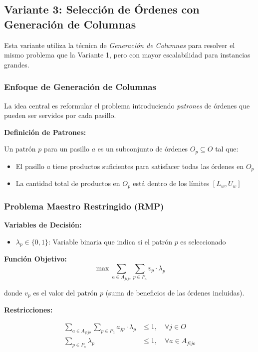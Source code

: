 \documentclass[a4paper,12pt]{article}
\begin{document}
\subsection{Variante 3: Selección de Órdenes con Generación de Columnas}
\label{sec:variante3}

Esta variante utiliza la técnica de \emph{Generación de Columnas} para resolver el mismo problema que la Variante 1, pero con mayor escalabilidad para instancias grandes.

\subsubsection{Enfoque de Generación de Columnas}

La idea central es reformular el problema introduciendo \emph{patrones} de órdenes que pueden ser servidos por cada pasillo.

\textbf{Definición de Patrones:}

Un patrón $p$ para un pasillo $a$ es un subconjunto de órdenes $O_p \subseteq O$ tal que:
\begin{itemize}
    \item El pasillo $a$ tiene productos suficientes para satisfacer todas las órdenes en $O_p$
    \item La cantidad total de productos en $O_p$ está dentro de los límites $[L_w, U_w]$
\end{itemize}

\subsubsection{Problema Maestro Restringido (RMP)}

\textbf{Variables de Decisión:}
\begin{itemize}
    \item $\lambda_p \in \{0,1\}$: Variable binaria que indica si el patrón $p$ es seleccionado
\end{itemize}

\textbf{Función Objetivo:}
\begin{equation}
\max \sum_{a \in A_{fijo}} \sum_{p \in P_a} v_p \cdot \lambda_p
\end{equation}

donde $v_p$ es el valor del patrón $p$ (suma de beneficios de las órdenes incluidas).

\textbf{Restricciones:}

\begin{align}
\sum_{a \in A_{fijo}} \sum_{p \in P_a} a_{jp} \cdot \lambda_p &\leq 1, \quad \forall j \in O \label{eq:order_once} \\
\sum_{p \in P_a} \lambda_p &\leq 1, \quad \forall a \in A_{fijo} \label{eq:one_pattern_per_aisle}
\end{align}
\end{document}

